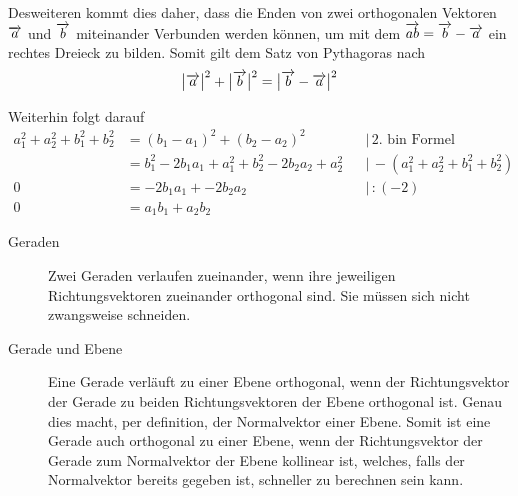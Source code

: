 \documentclass{article}
\begin{document}
\noindent \begin{minipage}{3.5cm}
\end{minipage}
\hfill
\begin{minipage}{\dimexpr\linewidth-3.5cm}
 Desweiteren kommt dies daher, dass die Enden von zwei orthogonalen Vektoren $\overrightarrow{a}$ und $\overrightarrow{b}$ miteinander Verbunden werden können, um mit dem $\overrightarrow{ab} = \overrightarrow{b} - \overrightarrow{a}$ ein rechtes Dreieck zu bilden. Somit gilt dem Satz von Pythagoras nach  
 \[  
  \big| {\overrightarrow{a}} \big|^2 + \big| {\overrightarrow{b}} \big|^2 = \big| {\overrightarrow{b} - \overrightarrow{a}} \big|^2
 \]
 
\end{minipage}
Weiterhin folgt darauf
\begin{align*}
 a_1^2+a_2^2+b_1^2+b_2^2 &= (b_1-a_1)^2 + (b_2-a_2)^2 && \vert\,\text{2. bin Formel} \\
   &= b_1^2-2b_1a_1+a_1^2 + b_2^2-2b_2a_2+a_2^2 && \vert\,-(a_1^2+a_2^2+b_1^2+b_2^2) \\
 0 &= -2b_1a_1 + -2b_2a_2 && \vert\, :(-2) \\
 0 &= a_1b_1+a_2b_2 
\end{align*}
 
\begin{description}
 \item[Geraden] Zwei Geraden verlaufen zueinander, wenn ihre jeweiligen Richtungsvektoren zueinander orthogonal sind. Sie müssen sich nicht zwangsweise schneiden.
 \item[Gerade und Ebene] Eine Gerade verläuft zu einer Ebene orthogonal, wenn der Richtungsvektor der Gerade zu beiden Richtungsvektoren der Ebene orthogonal ist. Genau dies macht, per definition, der Normalvektor einer Ebene. Somit ist eine Gerade auch orthogonal zu einer Ebene, wenn der Richtungsvektor der Gerade zum Normalvektor der Ebene kollinear ist, welches, falls der Normalvektor bereits gegeben ist, schneller zu berechnen sein kann. 
\end{description} 
 
\end{document}

